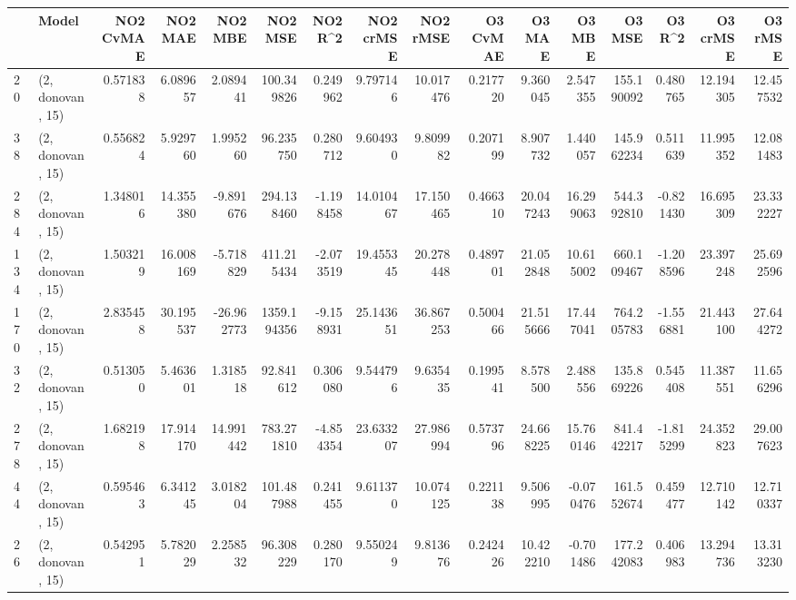 \begin{tabular}{llrrrrrrrrrrrrrr}
\toprule
{} &             Model &  NO2 CvMAE &    NO2 MAE &    NO2 MBE &      NO2 MSE &    NO2 R\textasciicircum2 &  NO2 crMSE &   NO2 rMSE &  O3 CvMAE &     O3 MAE &     O3 MBE &       O3 MSE &    O3 R\textasciicircum2 &   O3 crMSE &    O3 rMSE \\
\midrule
20  &  (2, donovan, 15) &   0.571838 &   6.089657 &   2.089441 &   100.349826 &   0.249962 &   9.797146 &  10.017476 &  0.217720 &   9.360045 &   2.547355 &   155.190092 &  0.480765 &  12.194305 &  12.457532 \\
38  &  (2, donovan, 15) &   0.556824 &   5.929760 &   1.995260 &    96.235750 &   0.280712 &   9.604930 &   9.809982 &  0.207199 &   8.907732 &   1.440057 &   145.962234 &  0.511639 &  11.995352 &  12.081483 \\
284 &  (2, donovan, 15) &   1.348016 &  14.355380 &  -9.891676 &   294.138460 &  -1.198458 &  14.010467 &  17.150465 &  0.466310 &  20.047243 &  16.299063 &   544.392810 & -0.821430 &  16.695309 &  23.332227 \\
134 &  (2, donovan, 15) &   1.503219 &  16.008169 &  -5.718829 &   411.215434 &  -2.073519 &  19.455345 &  20.278448 &  0.489701 &  21.052848 &  10.615002 &   660.109467 & -1.208596 &  23.397248 &  25.692596 \\
170 &  (2, donovan, 15) &   2.835458 &  30.195537 & -26.962773 &  1359.194356 &  -9.158931 &  25.143651 &  36.867253 &  0.500466 &  21.515666 &  17.447041 &   764.205783 & -1.556881 &  21.443100 &  27.644272 \\
32  &  (2, donovan, 15) &   0.513050 &   5.463601 &   1.318518 &    92.841612 &   0.306080 &   9.544796 &   9.635435 &  0.199541 &   8.578500 &   2.488556 &   135.869226 &  0.545408 &  11.387551 &  11.656296 \\
278 &  (2, donovan, 15) &   1.682198 &  17.914170 &  14.991442 &   783.271810 &  -4.854354 &  23.633207 &  27.986994 &  0.573796 &  24.668225 &  15.760146 &   841.442217 & -1.815299 &  24.352823 &  29.007623 \\
44  &  (2, donovan, 15) &   0.595463 &   6.341245 &   3.018204 &   101.487988 &   0.241455 &   9.611370 &  10.074125 &  0.221138 &   9.506995 &  -0.070476 &   161.552674 &  0.459477 &  12.710142 &  12.710337 \\
26  &  (2, donovan, 15) &   0.542951 &   5.782029 &   2.258532 &    96.308229 &   0.280170 &   9.550249 &   9.813676 &  0.242426 &  10.422210 &  -0.701486 &   177.242083 &  0.406983 &  13.294736 &  13.313230 \\

\end{tabular}

